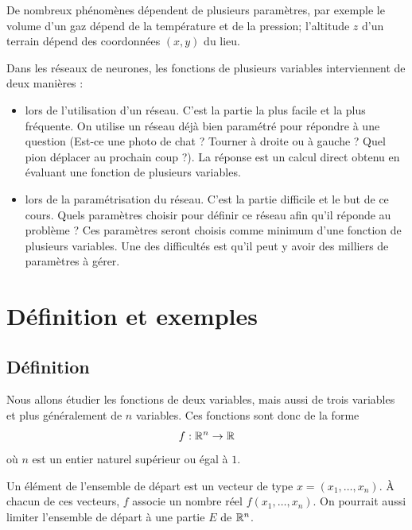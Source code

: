 De nombreux phénomènes dépendent de plusieurs paramètres, par exemple le volume d'un gaz dépend de la température et de la pression; l'altitude $z$ d'un terrain dépend des coordonnées $(x,y)$ du lieu.

Dans les réseaux de neurones, les fonctions de plusieurs variables interviennent de deux manières :
\begin{itemize}
	\item lors de l'utilisation d'un réseau. C'est la partie la plus facile et la plus fréquente. On utilise un réseau déjà bien paramétré pour répondre à une question (Est-ce une photo de chat ? Tourner à droite ou à gauche ? Quel pion déplacer au prochain coup ?). La réponse est un calcul direct obtenu en évaluant une fonction de plusieurs variables. 
	
	\item lors de la paramétrisation du réseau. C'est la partie difficile et le but de ce cours. Quels paramètres choisir pour définir ce réseau afin qu'il réponde au problème ? Ces paramètres seront choisis comme minimum d'une fonction de plusieurs variables. Une des difficultés est qu'il peut y avoir des milliers de paramètres à gérer.
	
\end{itemize}




\section{Définition et exemples}

\subsection{Définition}


Nous allons étudier les fonctions de deux variables, mais aussi de trois variables et plus généralement de $n$ variables.
Ces fonctions sont donc de la forme 
$$f : \mathbb{R}^n \rightarrow \mathbb{R}$$
où $n$ est un entier naturel supérieur ou égal à $1$. 


Un élément de l'ensemble de départ est un vecteur de type  $x = (x_1,\ldots,x_n)$. À chacun de ces vecteurs, $f$ associe un nombre réel $f(x_1,\ldots,x_n)$. On pourrait aussi limiter l'ensemble de départ à une partie $E$ de $ \mathbb{R}^n$.



